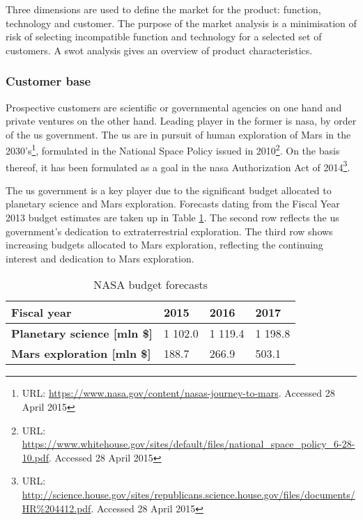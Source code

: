Three dimensions are used to define the market for the product: function, technology and customer. The purpose of the market analysis is a minimisation of risk of selecting incompatible function and technology for a selected set of customers. A \gls{swot} analysis gives an overview of product characteristics.

\subsubsection{Customer base}
Prospective customers are scientific or governmental agencies on one hand and private ventures on the other hand. Leading player in the former is \gls{nasa}, by order of the \gls{us} government. The \gls{us} are in pursuit of human exploration of Mars in the 2030's\footnote{URL: \url{https://www.nasa.gov/content/nasas-journey-to-mars}.  Accessed 28 April 2015}, formulated in the National Space Policy issued in 2010\footnote{URL: \url{https://www.whitehouse.gov/sites/default/files/national\_space\_policy\_6-28-10.pdf}. Accessed 28 April 2015}. On the basis thereof, it has been formulated as a goal in the \gls{nasa} Authorization Act of 2014\footnote{URL: \url{http://science.house.gov/sites/republicans.science.house.gov/files/documents/HR\%204412.pdf}. Accessed 28 April 2015}.

The \gls{us} government is a key player due to the significant budget allocated to planetary science and Mars exploration. Forecasts dating from the Fiscal Year 2013 budget estimates \cite{NASA2014a} are taken up in Table \ref{tab:cashbudgets}. The second row reflects the \gls{us} government's dedication to extraterrestrial exploration. The third row shows increasing budgets allocated to Mars exploration, reflecting the continuing interest and dedication to Mars exploration.

\begin{table}[h]
\centering
\caption{NASA budget forecasts}
\label{tab:cashbudgets}
\begin{tabular}{|l|l|l|l|}
\hline
{\bf Fiscal year}                    & 2015     & 2016    & 2017    \\ \hline
{\bf Planetary science {[}mln \${]}} & 1 102.0 & 1 119.4 & 1 198.8 \\ \hline
{\bf Mars exploration {[}mln \${]}}  & 188.7   & 266.9   & 503.1   \\ \hline
\end{tabular}
\end{table}


